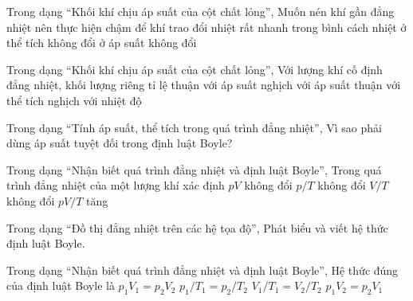 \begin{ex}
Trong dạng “Khối khí chịu áp suất của cột chất lỏng”, Muốn nén khí gần đẳng nhiệt nên thực hiện
\choice
{\True chậm để khí trao đổi nhiệt}
{rất nhanh trong bình cách nhiệt}
{ở thể tích không đổi}
{ở áp suất không đổi}
\end{ex}

\begin{ex}
Trong dạng “Khối khí chịu áp suất của cột chất lỏng”, Với lượng khí cố định đẳng nhiệt, khối lượng riêng tỉ lệ
\choice
{\True thuận với áp suất}
{nghịch với áp suất}
{thuận với thể tích}
{nghịch với nhiệt độ}
\end{ex}

\begin{ex}
Trong dạng “Tính áp suất, thể tích trong quá trình đẳng nhiệt”, Vì sao phải dùng áp suất tuyệt đối trong định luật Boyle?
\choiceTF

\end{ex}

\begin{ex}
Trong dạng “Nhận biết quá trình đẳng nhiệt và định luật Boyle”, Trong quá trình đẳng nhiệt của một lượng khí xác định
\choice
{\True $pV$ không đổi}
{$p/T$ không đổi}
{$V/T$ không đổi}
{$pV/T$ tăng}
\end{ex}

\begin{ex}
Trong dạng “Đồ thị đẳng nhiệt trên các hệ tọa độ”, Phát biểu và viết hệ thức định luật Boyle.
\choiceTF

\end{ex}

\begin{ex}
Trong dạng “Nhận biết quá trình đẳng nhiệt và định luật Boyle”, Hệ thức đúng của định luật Boyle là
\choice
{\True $p_1V_1=p_2V_2$}
{$p_1/T_1=p_2/T_2$}
{$V_1/T_1=V_2/T_2$}
{$p_1V_2=p_2V_1$}
\end{ex}

